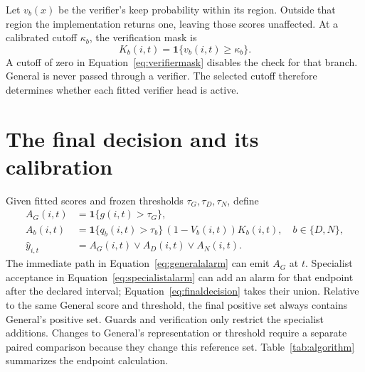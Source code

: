 Let $v_b(x)$ be the verifier's keep probability within its region. Outside that region the implementation returns one, leaving those scores unaffected. At a calibrated cutoff $\kappa_b$, the verification mask is
\begin{equation}
 K_b(i,t)=\mathbf1\{v_b(i,t)\geq\kappa_b\}.\label{eq:verifiermask}
\end{equation}
A cutoff of zero in Equation~\eqref{eq:verifiermask} disables the check for that branch. General is never passed through a verifier. The selected cutoff therefore determines whether each fitted verifier head is active.

\section{The final decision and its calibration}
Given fitted scores and frozen thresholds $\tau_G,\tau_D,\tau_N$, define
\begin{align}
 A_G(i,t)&=\mathbf1\{g(i,t)>\tau_G\},\label{eq:generalalarm}\\
 A_b(i,t)&=\mathbf1\{q_b(i,t)>\tau_b\}\,(1-V_b(i,t))K_b(i,t),\quad b\in\{D,N\},\label{eq:specialistalarm}\\
 \widehat y_{i,t}&=A_G(i,t)\lor A_D(i,t)\lor A_N(i,t).
 \label{eq:finaldecision}
\end{align}
The immediate path in Equation~\eqref{eq:generalalarm} can emit $A_G$ at $t$. Specialist acceptance in Equation~\eqref{eq:specialistalarm} can add an alarm for that endpoint after the declared interval; Equation~\eqref{eq:finaldecision} takes their union. Relative to the same General score and threshold, the final positive set always contains General's positive set. Guards and verification only restrict the specialist additions. Changes to General's representation or threshold require a separate paired comparison because they change this reference set. Table~\ref{tab:algorithm} summarizes the endpoint calculation.

